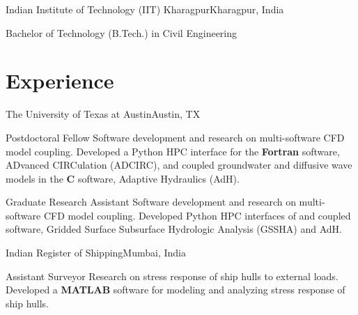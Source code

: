 \documentclass[letterpaper,11pt]{article}
\begin{document}
    \resumeSubheading
      {Indian Institute of Technology (IIT) Kharagpur}{Kharagpur, India}

      \resumeSubSubheading
        {Bachelor of Technology (B.Tech.) in Civil Engineering}{}

  \resumeSubHeadingListEnd

\section{Experience}
  \resumeSubHeadingListStart

    \resumeSubheading
      {The University of Texas at Austin}{Austin, TX}

      \resumeSubSubheading
        {Postdoctoral Fellow}{}
        \resumeItemListStart
            {Software development and research on multi-software CFD model
            coupling.}
            {Developed a Python HPC interface for the \textbf{Fortran} software,
            ADvanced CIRCulation (ADCIRC), and coupled groundwater and diffusive
            wave models in the \textbf{C} software, Adaptive Hydraulics (AdH).}
        \resumeItemListEnd

      \resumeSubSubheading
       {Graduate Research Assistant}{}
       \resumeItemListStart
            {Software development and research on multi-software CFD model
            coupling.}
            {Developed Python HPC interfaces of and coupled \textbf{\CC{}}
            software, Gridded Surface Subsurface Hydrologic Analysis (GSSHA) and
            AdH.}
       \resumeItemListEnd

    \resumeSubheading
      {Indian Register of Shipping}{Mumbai, India}

      \resumeSubSubheading
        {Assistant Surveyor}{}
        \resumeItemListStart
            {Research on stress response of ship hulls to external loads.}
            {Developed a \textbf{MATLAB} software for modeling and analyzing
            stress response of ship hulls.}
        \resumeItemListEnd
\end{document}
